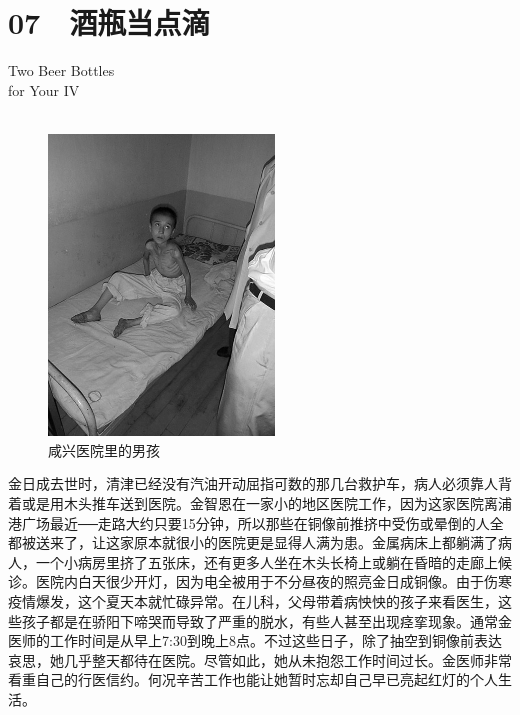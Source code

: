 \fancyhead[RO]{{\tiny{\textcolor{Gray}{\FA \ }}}\thepage}
\fancyhead[LE]{{\tiny{\textcolor{Gray}{\FA \ }}}\thepage}
\fancyfoot[LE,RO]{}
\fancyfoot[LO,CE]{}
\fancyfoot[CO,RE]{}
\chapter*{07 {\FA } 酒瓶当点滴}
\vspace{5mm}
\begin{flushright}
	\textcolor{PinYinColor}{\EN \huge{Two Beer Bottles\\
		for Your IV\\
	\ \\}}
\end{flushright}
\begin{figure}[!htbp]
	\centering
	\includegraphics[width=6cm]{./Chapters/Images/07.jpg}
	\caption*{咸兴医院里的男孩}
\end{figure}


金日成去世时，清津已经没有汽油开动屈指可数的那几台救护车，病人必须靠人背着或是用木头推车送到医院。金智恩在一家小的地区医院工作，因为这家医院离浦港广场最近──走路大约只要15分钟，所以那些在铜像前推挤中受伤或晕倒的人全都被送来了，让这家原本就很小的医院更是显得人满为患。金属病床上都躺满了病人，一个小病房里挤了五张床，还有更多人坐在木头长椅上或躺在昏暗的走廊上候诊。医院内白天很少开灯，因为电全被用于不分昼夜的照亮金日成铜像。由于伤寒疫情爆发，这个夏天本就忙碌异常。在儿科，父母带着病怏怏的孩子来看医生，这些孩子都是在骄阳下啼哭而导致了严重的脱水，有些人甚至出现痉挛现象。通常金医师的工作时间是从早上7:30到晚上8点。不过这些日子，除了抽空到铜像前表达哀思，她几乎整天都待在医院。尽管如此，她从未抱怨工作时间过长。金医师非常看重自己的行医信约。何况辛苦工作也能让她暂时忘却自己早已亮起红灯的个人生活。\\

